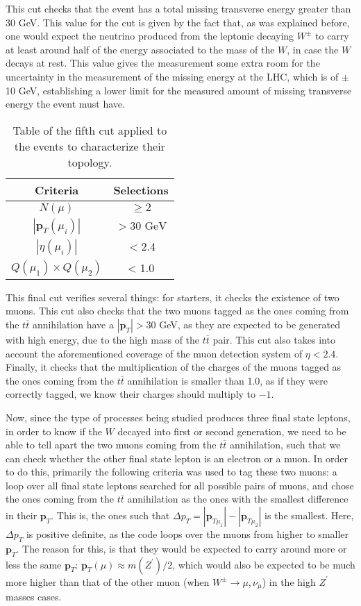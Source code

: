 This cut checks that the event has a total missing transverse energy greater than 30 GeV. This value for the cut is given by the fact that, as was explained before, one would expect the neutrino produced from the leptonic decaying $W^{\pm}$ to carry at least around half of the energy associated to the mass of the $W$, in case the $W$ decays at rest. This value gives the measurement some extra room for the uncertainty in the measurement of the missing energy at the LHC, which is of $\pm$10 GeV, establishing a lower limit for the measured amount of missing transverse energy the event must have.  

\begin{table}[ht!]
\centering
\caption{Table of the fifth cut applied to the events to characterize their topology.}
\label{cut5}
\begin{tabular}{cc}
\hline
\hline
 Criteria & Selections \\
\hline
 $N(\mu)$ & $\geq 2$ \\
 $|\bm{p}_T(\mu_i)|$ & $> 30\textrm{ GeV}$ \\
 $|\eta(\mu_i)|$ & $< 2.4$  \\
 $Q(\mu_1)\times Q(\mu_2)$ & < 1.0 \\
\hline
\hline
\end{tabular}
\end{table}

This final cut verifies several things: for starters, it checks the existence of two muons. This cut also checks that the two muons tagged as the ones coming from the $t\overline t$ annihilation have a $|\bm{p}_T| > 30$ GeV, as they are expected to be generated with high energy, due to the high mass of the $t\overline t$ pair. This cut also takes into account the aforementioned coverage of the muon detection system of $\eta < 2.4$. Finally, it checks that the multiplication of the charges of the muons tagged as the ones coming from the $t\overline t$ annihilation is smaller than 1.0, as if they were correctly tagged, we know their charges should multiply to $-1$.

Now, since the type of processes being studied produces three final state leptons, in order to know if the $W$ decayed into first or second generation, we need to be able to tell apart the two muons coming from the $t\overline t$ annihilation, such that we can check whether the other final state lepton is an electron or a muon. In order to do this, primarily the following criteria was used to tag these two muons: a loop over all final state leptons searched for all possible pairs of muons, and chose the ones coming from the $t\overline t$ annihilation as the ones with the smallest difference in their $\bm{p}_T$. This is, the ones such that $\Delta p_T = |\bm{p}_{T\mu_1}| - |\bm{p}_{T\mu_2}|$ is the smallest. Here, $\Delta p_T$ is positive definite, as the code loops over the muons from higher to smaller $\bm{p}_T$. The reason for this, is that they would be expected to carry around more or less the same $\bm{p}_T$: $\bm{p}_{T}(\mu) \approx m(Z^{\prime})/2$, which would also be expected to be much more higher than that of the other muon (when $W^{\pm} \rightarrow \mu, \nu_{\mu}$) in the high $Z^{\prime}$ masses cases.

